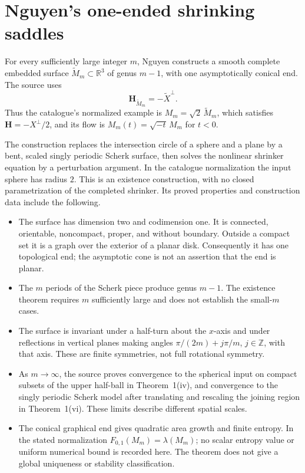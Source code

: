 \chapter{Nguyen's one-ended shrinking saddles}\label{sec:catalogue-nguyen-shrinking-saddles}
\begin{example}\label{ex:catalogue-nguyen-shrinking-saddles}
For every sufficiently large integer $m$, Nguyen constructs a smooth complete embedded surface $\widetilde M_m\subset\mathbb R^3$ of genus $m-1$, with one asymptotically conical end. The source uses
\[
 \mathbf H_{\widetilde M_m}=-\widetilde X^\perp.
\]
Thus the catalogue's normalized example is $M_m=\sqrt{2}\,\widetilde M_m$, which satisfies $\mathbf H=-X^\perp/2$, and its flow is $M_m(t)=\sqrt{-t}\,M_m$ for $t<0$.

The construction replaces the intersection circle of a sphere and a plane by a bent, scaled singly periodic Scherk surface, then solves the nonlinear shrinker equation by a perturbation argument. In the catalogue normalization the input sphere has radius $2$. This is an existence construction, with no closed parametrization of the completed shrinker. Its proved properties and construction data include the following.
\begin{itemize}
\item The surface has dimension two and codimension one. It is connected, orientable, noncompact, proper, and without boundary. Outside a compact set it is a graph over the exterior of a planar disk. Consequently it has one topological end; the asymptotic cone is not an assertion that the end is planar.
\item The $m$ periods of the Scherk piece produce genus $m-1$. The existence theorem requires $m$ sufficiently large and does not establish the small-$m$ cases.
\item The surface is invariant under a half-turn about the $x$-axis and under reflections in vertical planes making angles $\pi/(2m)+j\pi/m$, $j\in\mathbb Z$, with that axis. These are finite symmetries, not full rotational symmetry.
\item As $m\to\infty$, the source proves convergence to the spherical input on compact subsets of the upper half-ball in Theorem~1(iv), and convergence to the singly periodic Scherk model after translating and rescaling the joining region in Theorem~1(vi). These limits describe different spatial scales.
\item The conical graphical end gives quadratic area growth and finite entropy. In the stated normalization $F_{0,1}(M_m)=\lambda(M_m)$; no scalar entropy value or uniform numerical bound is recorded here. The theorem does not give a global uniqueness or stability classification.
\end{itemize}


\end{example}
